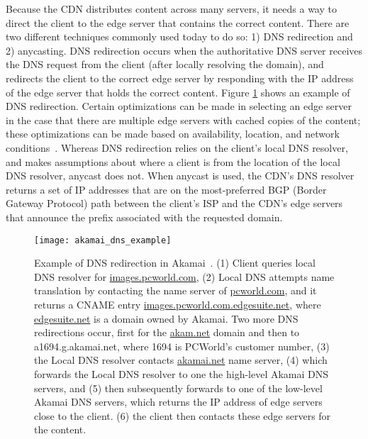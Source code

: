 Because the CDN distributes content across many servers, it needs a way to direct the client 
to the edge server that contains the correct content.  There are two different techniques commonly used 
today to do so: 1) DNS redirection and 2) anycasting. DNS redirection occurs when the authoritative DNS 
server receives the DNS request from the client (after locally resolving the domain), and redirects the client 
to the correct edge server by responding with the IP address of the edge server that holds the correct content. 
Figure \ref{fig:dns_redirection} shows an example of DNS redirection. Certain 
optimizations can be made in selecting an edge server in the case that there are multiple edge servers 
with cached copies of the content; these optimizations can be made based on availability, location, and 
network conditions~\cite{krishnamurthy2001use}.  Whereas DNS redirection relies on the client's local DNS 
resolver, and makes assumptions about where a client is from the location of the local DNS resolver, 
anycast does not.  When anycast is used, the CDN's DNS resolver returns a set of IP addresses that 
are on the most-preferred BGP (Border Gateway Protocol) path between the client's ISP and the CDN's 
edge servers that announce the prefix associated with the requested domain.

\begin{figure}[t]
\centering
\texttt{[image: akamai\_dns\_example]}
\caption{Example of DNS redirection in Akamai~\cite{su2009drafting}.  (1) Client queries local DNS resolver 
for \url{images.pcworld.com}, (2) Local DNS attempts name translation by contacting the name server 
of \url{pcworld.com}, and it returns a CNAME entry \url{images.pcworld.com.edgesuite.net}, where \url{edgesuite.net} 
is a domain owned by Akamai.  Two more DNS redirections occur, first for the \url{akam.net} domain and then to 
a1694.g.akamai.net, where 1694 is PCWorld's customer number, (3) the Local DNS resolver contacts \url{akamai.net} 
name server, (4) which forwards the Local DNS resolver to one the high-level Akamai DNS servers, and (5) then subsequently 
forwards to one of the low-level Akamai DNS servers, which returns the IP address of edge servers close to the client.  (6) 
the client then contacts these edge servers for the content. }
\label{fig:dns_redirection}
\end{figure}

